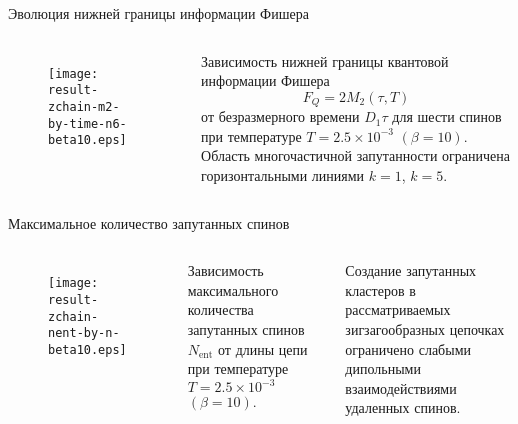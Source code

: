 \begin{frame}{Эволюция нижней границы информации Фишера}
\begin{columns}

    \begin{figure}
    \texttt{[image: result-zchain-m2-by-time-n6-beta10.eps]}
    \end{figure}

    Зависимость нижней границы квантовой информации Фишера
    $$ F_Q = 2M_2(\tau, T) $$
    от безразмерного времени $D_1 \tau$
    для шести спинов
    при температуре $T = 2.5 \times 10^{-3}$ $(\beta = 10)$.
    Область многочастичной запутанности ограничена горизонтальными линиями $k = 1$, $k = 5$.
\end{columns}
\end{frame}


\begin{frame}{Максимальное количество запутанных спинов}
\begin{columns}

    \begin{figure}
    \texttt{[image: result-zchain-nent-by-n-beta10.eps]}
    \caption{}
    \end{figure}

    Зависимость максимального количества запутанных спинов $N_\mathrm{ent}$ от длины цепи при температуре $T = 2.5 \times 10^{-3}$ $(\beta = 10)$.

    \vspace{0.5cm}

    \alert{Создание запутанных кластеров в рассматриваемых зигзагообразных цепочках ограничено слабыми дипольными взаимодействиями удаленных спинов}.
\end{columns}
\end{frame}


